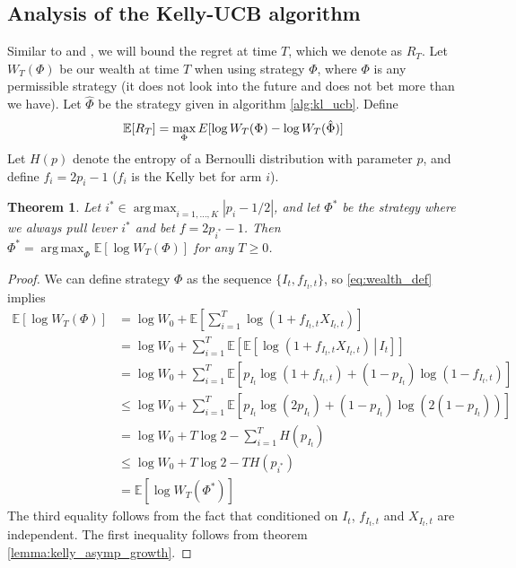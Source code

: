 \documentclass[letterpaper]{article}
\DeclareMathOperator*{\argmax}{arg\,max}
\numberwithin{equation}{section}
\theoremstyle{plain}
\newtheorem{theorem}{Theorem}[section]
\begin{document}
\subsection{Analysis of the Kelly-UCB algorithm}\label{analysiskellyucb}
Similar to \cite{cappe2013kullback} and \cite{bubeck2012regret}, we will bound the regret at time $T$, which we denote as $R_T$. Let $W_T(\Phi)$ be our wealth at time $T$ when using strategy $\Phi$, where $\Phi$ is any permissible strategy (it does not look into the future and does not bet more than we have). Let $\hat{\Phi}$ be the strategy given in algorithm \ref{alg:kl_ucb}. Define
\begin{equation}\label{eq:regret_def}
\mathbb{E}[R_T] = \max_\Phi E[\log W_T(\Phi) - \log W_T(\hat{\Phi})]\\
\end{equation}
Let $H(p)$ denote the entropy of a Bernoulli distribution with parameter $p$, and define $f_i = 2p_i-1$ ($f_i$ is the Kelly bet for arm $i$).
\begin{theorem}\label{thm:kelly_optimal_mab}
Let $i^*\in\argmax_{i=1,\ldots,K}|p_i-1/2|$, and let $\Phi^*$ be the strategy where we always pull lever $i^*$ and bet $f = 2p_{i^*}-1$. Then $\Phi^* = \argmax_{\Phi} \mathbb{E}[\log W_T(\Phi)]$ for any $T \ge 0$.
\end{theorem}
\begin{proof}
We can define strategy $\Phi$ as the sequence $\{I_t,f_{I_t,t}\}$, so \eqref{eq:wealth_def} implies
\begin{align}
\mathbb{E}[\log W_T(\Phi)] &= \log W_0 + \mathbb{E}\left[\sum_{i=1}^T \log(1+f_{I_t,t}X_{I_t,t})\right]\\
&= \log W_0 + \sum_{i=1}^T \mathbb{E}\left[\mathbb{E}\left[\left.\log(1+f_{I_t,t}X_{I_t,t})\,\right\rvert\, I_t\right]\right]\\
&= \log W_0 + \sum_{i=1}^T \mathbb{E}\left[p_{I_t}\log(1+f_{I_t,t})+(1-p_{I_t})\log(1-f_{I_t,t})\right]\\
&\le \log W_0 + \sum_{i=1}^T \mathbb{E}\left[p_{I_t}\log(2p_{I_t})+(1-p_{I_t})\log(2(1-p_{I_t}))\right]\\
&= \log W_0 + T\log 2 - \sum_{i=1}^T H(p_{I_t})\\
&\le \log W_0 + T\log 2 - T H(p_{i^*})\\
&= \mathbb{E}[\log W_T(\Phi^*)]
\end{align}
The third equality follows from the fact that conditioned on $I_t$, $f_{I_t,t}$ and $X_{I_t,t}$ are independent. The first inequality follows from theorem \ref{lemma:kelly_asymp_growth}.
\end{proof}
\end{document}
